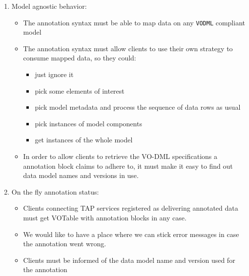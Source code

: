 \begin {enumerate}
  \item Model agnostic behavior:
  \begin {itemize}
    \item The annotation syntax must be able to map data on any \texttt{VODML} compliant model
    \item The annotation syntax must allow clients to use their own strategy to consume mapped data, so they could:
      \begin {itemize}
        \item just ignore it
        \item pick some elements of interest 
        \item pick model metadata and process the sequence of data rows as usual
        \item pick instances of model components 
        \item get instances of the whole model  
      \end {itemize}
    \item In order to allow clients to retrieve the VO-DML specifications a annotation block claims to adhere to, 
          it must make it easy to find out data model names and versions in use.
  \end {itemize}
  
  \item On the fly annotation status:
      \begin {itemize} 
          \item Clients connecting TAP services registered as delivering annotated data must get VOTable with annotation blocks in any case. 
          \item We would like to have a place where we can stick error messages in case the annotation went wrong.
          \item Clients must be informed of the data model name and version used for the annotation  
       \end {itemize}

\end {enumerate}
